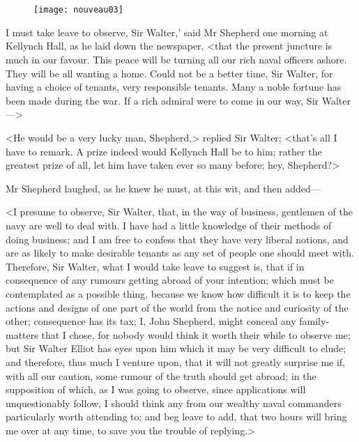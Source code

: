 \chapter[Chapter \thechapter]{}

\begin{figure}[t!]
\centering
\texttt{[image: nouveau03]}
\end{figure}

\lettrine[lraise=0.3,ante=`]{I}{} must take leave to observe, Sir Walter,' said Mr Shepherd one morning at Kellynch Hall, as he laid down the newspaper, <that the present juncture is much in our favour. This peace will be turning all our rich naval officers ashore. They will be all wanting a home. Could not be a better time, Sir Walter, for having a choice of tenants, very responsible tenants. Many a noble fortune has been made during the war. If a rich admiral were to come in our way, Sir Walter—>

<He would be a very lucky man, Shepherd,> replied Sir Walter; <that's all I have to remark. A prize indeed would Kellynch Hall be to him; rather the greatest prize of all, let him have taken ever so many before; hey, Shepherd?>

Mr Shepherd laughed, as he knew he must, at this wit, and then added—

<I presume to observe, Sir Walter, that, in the way of business, gentlemen of the navy are well to deal with. I have had a little knowledge of their methods of doing business; and I am free to confess that they have very liberal notions, and are as likely to make desirable tenants as any set of people one should meet with. Therefore, Sir Walter, what I would take leave to suggest is, that if in consequence of any rumours getting abroad of your intention; which must be contemplated as a possible thing, because we know how difficult it is to keep the actions and designs of one part of the world from the notice and curiosity of the other; consequence has its tax; I, John Shepherd, might conceal any family-matters that I chose, for nobody would think it worth their while to observe me; but Sir Walter Elliot has eyes upon him which it may be very difficult to elude; and therefore, thus much I venture upon, that it will not greatly surprise me if, with all our caution, some rumour of the truth should get abroad; in the supposition of which, as I was going to observe, since applications will unquestionably follow, I should think any from our wealthy naval commanders particularly worth attending to; and beg leave to add, that two hours will bring me over at any time, to save you the trouble of replying.>

